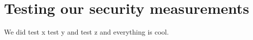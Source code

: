 \section{Testing our security measurements}
We did test x test y and test z and everything is cool.
